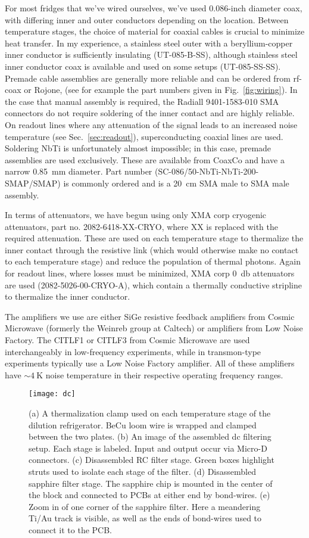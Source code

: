 For most fridges that we've wired ourselves, we've used 0.086-inch diameter coax, with differing inner and outer
conductors depending on the location. Between temperature stages, the choice of material for coaxial cables is
crucial to minimize heat transfer. In my experience, a stainless steel outer with a beryllium-copper inner conductor is
sufficiently insulating (UT-085-B-SS), although stainless steel inner conductor coax is available and used on some
setups (UT-085-SS-SS). Premade cable assemblies are generally more reliable and can be ordered from rf-coax or Rojone,
(see for example the part numbers given in Fig.~\ref{fig:wiring}). In the case that manual assembly is required,
the Radiall 9401-1583-010 SMA connectors do not require soldering of the inner contact and are highly reliable. On
readout lines where any attenuation of the signal leads to an increased noise temperature
(see Sec.~\ref{sec:readout}), superconducting coaxial lines are used. Soldering NbTi is unfortunately almost
impossible; in this case, premade assemblies are used exclusively. These are available from CoaxCo and
have a narrow \SI{0.85}{\milli\meter} diameter. Part number (SC-086/50-NbTi-NbTi-200-SMAP/SMAP) is commonly
ordered and is a \SI{20}{\centi\meter} SMA male to SMA male assembly.

In terms of attenuators, we have begun using only XMA corp cryogenic attenuators, part no. 2082-6418-XX-CRYO,
where XX is replaced with the required attenuation. These are used on each temperature stage to thermalize
the inner contact through the resistive link (which would otherwise make no contact to each temperature stage) and
reduce the population of thermal photons. Again for readout lines, where losses must be minimized, XMA corp
\SI{0}{\decibel} attenuators are used (2082-5026-00-CRYO-A), which contain a thermally conductive stripline to
thermalize the inner conductor.

The amplifiers we use are either SiGe resistive feedback amplifiers from Cosmic Microwave (formerly the Weinreb group
at Caltech) or amplifiers from Low Noise Factory. The CITLF1 or CITLF3 from Cosmic Microwave are used interchangeably in
low-frequency experiments, while in transmon-type experiments typically use a Low Noise Factory amplifier. All of these amplifiers
have $\sim \SI{4}{\kelvin}$ noise temperature in their respective operating frequency ranges.

\begin{figure}
    \texttt{[image: dc]}
    \caption[DC thermalization]
    {\label{fig:dc}(a) A thermalization clamp used on each temperature stage of the dilution refrigerator. BeCu loom wire is wrapped and clamped between the two plates. (b) An image of the assembled dc filtering setup. Each stage is labeled. Input and output occur via Micro-D connectors. (c) Disassembled RC filter stage. Green boxes highlight struts used to isolate each stage of the filter. (d) Disassembled sapphire filter stage. The sapphire chip is mounted in the center of the block and connected to PCBs at either end by bond-wires. (e) Zoom in of one corner of the sapphire filter. Here a meandering Ti/Au track is visible, as well as the ends of bond-wires
    used to connect it to the PCB.}
\end{figure}

